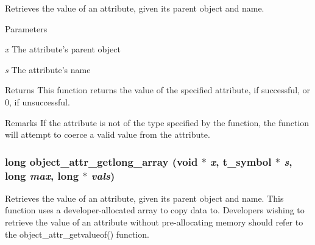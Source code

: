 Retrieves the value of an attribute, given its parent object and name. 
\begin{DoxyParams}{Parameters}
\item[{\em x}]The attribute's parent object \item[{\em s}]The attribute's name\end{DoxyParams}
\begin{DoxyReturn}{Returns}
This function returns the value of the specified attribute, if successful, or 0, if unsuccessful.
\end{DoxyReturn}
\begin{DoxyRemark}{Remarks}
If the attribute is not of the type specified by the function, the function will attempt to coerce a valid value from the attribute. 
\end{DoxyRemark}
\hypertarget{group__attr_ga3dd4b5711887439c6df373b1d546701c}{
\subsubsection[{object\_\-attr\_\-getlong\_\-array}]{\setlength{\rightskip}{0pt plus 5cm}long object\_\-attr\_\-getlong\_\-array (void $\ast$ {\em x}, \/  {\bf t\_\-symbol} $\ast$ {\em s}, \/  long {\em max}, \/  long $\ast$ {\em vals})}}
\label{group__attr_ga3dd4b5711887439c6df373b1d546701c}


Retrieves the value of an attribute, given its parent object and name. This function uses a developer-\/allocated array to copy data to. Developers wishing to retrieve the value of an attribute without pre-\/allocating memory should refer to the object\_\-attr\_\-getvalueof() function.


